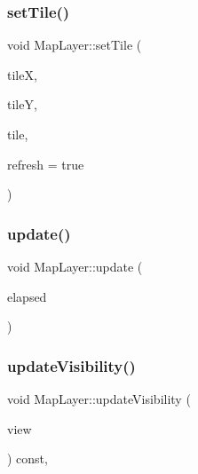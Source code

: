 \mbox{\label{classMapLayer_a1152792435a0fa6203f6c3a038b93778}} 
\subsubsection{\texorpdfstring{set\+Tile()}{setTile()}}
{\footnotesize\ttfamily void Map\+Layer\+::set\+Tile (\begin{DoxyParamCaption}\item[{int}]{tileX,  }\item[{int}]{tileY,  }\item[{tmx\+::\+Tile\+Layer\+::\+Tile}]{tile,  }\item[{bool}]{refresh = {\ttfamily true} }\end{DoxyParamCaption})\hspace{0.3cm}{\ttfamily [inline]}}

\mbox{\label{classMapLayer_a0f7690e23ecfde7a7dc6629f9df65635}} 
\subsubsection{\texorpdfstring{update()}{update()}}
{\footnotesize\ttfamily void Map\+Layer\+::update (\begin{DoxyParamCaption}\item[{sf\+::\+Time}]{elapsed }\end{DoxyParamCaption})\hspace{0.3cm}{\ttfamily [inline]}}

\mbox{\label{classMapLayer_a6602d1d89676fa73ace9934f7b77c0c5}} 
\subsubsection{\texorpdfstring{update\+Visibility()}{updateVisibility()}}
{\footnotesize\ttfamily void Map\+Layer\+::update\+Visibility (\begin{DoxyParamCaption}\item[{const sf\+::\+View \&}]{view }\end{DoxyParamCaption}) const\hspace{0.3cm}{\ttfamily [inline]}, {\ttfamily [private]}}



